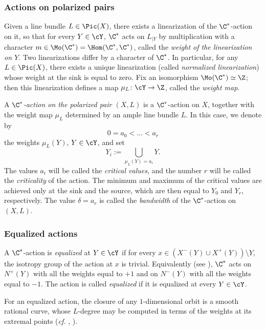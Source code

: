 \documentclass[11pt]{amsart}
\numberwithin{equation}{section}
\theoremstyle{definition}
\theoremstyle{remark}
\begin{document}
\subsubsection{Actions on polarized pairs}\label{ssec:polar} Given  a line bundle $L\in \Pic(X)$, there exists a linearization of the $\C^*$-action on it, so that for every $Y\in \cY$, $\C^*$ acts on $L_{|Y}$ by multiplication with a character $m\in \Mo(\C^*)=\Hom(\C^*,\C^*)$, called the {\em weight of the linearization on $Y$}. Two linearizations differ by a character of $\C^*$. In particular, for any  $L \in \Pic(X)$, there exists a unique linearization (called {\em normalized linearization})  whose weight at the sink is equal to zero. 
Fix an isomorphism $\Mo(\C^*)\simeq \Z$; then  this linearization defines a map  $\mu_L\colon\cY\to\Z$, called the {\em weight map}. 


A {\em $\C^*$-action on the polarized pair $(X,L)$} is a $\C^*$-action on $X$, together with the weight map $\mu_L$ determined by an ample line bundle $L$.  In this case, we denote by
$$
0=a_0<\dots<a_r
$$ 
the weights $\mu_L(Y)$, $Y\in\cY$, 
and set 
$$
Y_i:=\bigcup_{\mu_L(Y)=a_i}Y.
$$ 
The values $a_i$ will be called the {\em critical values}, and the number $r$ will be called the {\em criticality} of the action.
The minimum and maximum of the critical values are achieved only at the  sink and the  source, 
which are then equal to $Y_0$ and $Y_r$, respectively. The value $\delta=a_r$ is called the {\em bandwidth} of the $\C^*$-action on $(X,L)$. 

\subsubsection{Equalized actions}\label{sssec:equal}

A $\C^*$-action  is {\em  equalized} at $Y\in\cY$ if for every $x\in (X^{-}(Y)\cup X^{+}(Y))\setminus Y$, the isotropy group of the action at $x$ is trivial. Equivalently (see \cite[Lemma 2.1]{WORS3}), $\C^*$ acts on $N^+(Y)$ with all the weights equal to $+1$ and on $N^-(Y)$ with all the weights equal to $-1$. The action is called {\em equalized} if it is equalized at every $Y \in \cY$.

For an equalized action, the closure of any $1$-dim\-ens\-ional orbit is a smooth rational curve, whose $L$-degree may be computed in terms of the weights at its extremal points (\textit{cf.} \cite[Lemma 2.2]{WORS3}, \cite[Corollary 3.2]{RW}).  
\end{document}
